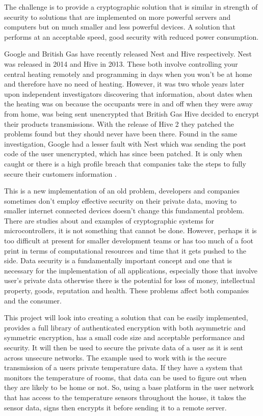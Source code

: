 	The challenge is to provide a cryptographic solution that is similar in strength of security to solutions that are implemented on more powerful servers and computers but on much smaller and less powerful devices. A solution that performs at an acceptable speed, good security with reduced power consumption.
	
	Google and British Gas have recently released Nest and Hive respectively. Nest was released in 2014 and Hive in 2013. These both involve controlling your central heating remotely and programming in days when you won't be at home and therefore have no need of heating. However, it was two whole years later upon independent investigators discovering that information, about dates when the heating was on because the occupants were in and off when they were away from home, was being sent unencrypted that British Gas Hive decided to encrypt their products transmissions. With the release of Hive 2 they patched the problems found but they should never have been there. Found in the same investigation, Google had a lesser fault with Nest which was sending the post code of the user unencrypted, which has since been patched. It is only when caught or there is a high profile breach that companies take the steps to fully secure their customers information \cite{which}. 
	
	This is a new implementation of an old problem, developers and companies sometimes don't employ effective security on their private data, moving to smaller internet connected devices doesn't change this fundamental problem. There are studies about and examples of cryptographic systems for microcontrollers, it is not something that cannot be done. However, perhaps it is too difficult at present for smaller development teams or has too much of a foot print in terms of computational resources and time that it gets pushed to the side. Data security is a fundamentally important concept and one that is necessary for the implementation of all applications, especially those that involve user's private data otherwise there is the potential for loss of money, intellectual property, goods, reputation and health. These problems affect both companies and the consumer.
	
	This project will look into creating a solution that can be easily implemented, provides a full library of authenticated encryption with both asymmetric and symmetric encryption, has a small code size and acceptable performance and security. It will then be used to secure the private data of a user as it is sent across unsecure networks. The example used to work with is the secure transmission of a users private temperature data. If they have a system that monitors the temperature of rooms, that data can be used to figure out when they are likely to be home or not. So, using a base platform in the user network that has access to the temperature sensors throughout the house, it takes the sensor data, signs then encrypts it before sending it to a remote server. 
	
	
	